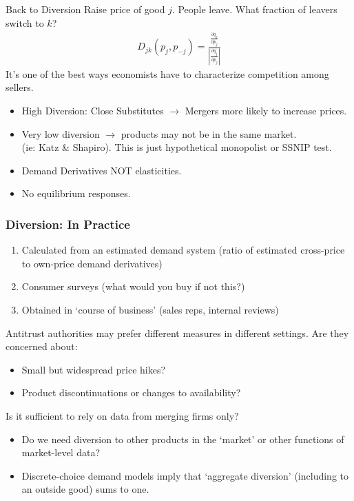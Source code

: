 \documentclass[aspectratio=169,10pt]{beamer}
\begin{document}
\begin{frame}{Back to Diversion}
 Raise price of good $j$. People leave. What fraction of leavers switch to $k$?
\begin{eqnarray*}
D_{jk} (p_j,p_{-j})= \frac{\frac{\partial q_k}{\partial p_j}}{\left|\frac{\partial q_j}{\partial p_j} \right|}
\end{eqnarray*}
It's one of the best ways economists have to characterize competition among sellers.
\begin{itemize}
\item High Diversion: Close Substitutes $\rightarrow$ Mergers more likely to increase prices.
\item Very low diversion $\rightarrow$ products may not be in the same market.\\ (ie: Katz \& Shapiro). This is just hypothetical monopolist or SSNIP test.
\item Demand Derivatives NOT elasticities.
\item No equilibrium responses.
\end{itemize}
\end{frame}





\begin{frame}
\frametitle{Diversion: In Practice}
\begin{enumerate}
\item Calculated from an estimated demand system (ratio of estimated cross-price to own-price demand derivatives)
\item Consumer surveys (what would you buy if not this?)
\item Obtained in `course of business' (sales reps, internal reviews)
\end{enumerate}
Antitrust authorities may prefer different measures in different settings. Are they concerned about:
\begin{itemize}
\item Small but widespread price hikes?
\item Product discontinuations or changes to availability?
\end{itemize}
Is it sufficient to rely on data from merging firms only?
\begin{itemize}
\item Do we need diversion to other products in the `market' or other functions of market-level data?
\item Discrete-choice demand models imply that `aggregate diversion' (including to an outside good) sums to one.
\end{itemize}
\end{frame}
\end{document}
